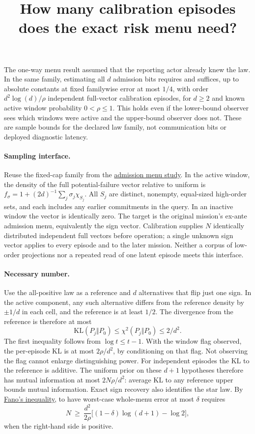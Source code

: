 \documentclass{article}
\title{How many calibration episodes does the exact risk menu need?}
\begin{document}
\maketitle

The one-way menu result assumed that the reporting actor already knew
the law. In the same family, estimating all \(d\) admission bits
requires and suffices, up to absolute constants at fixed familywise
error at most \(1/4\), with order \(d^2\log(d)/\rho\) independent
full-vector calibration episodes, for \(d\ge2\) and known active
window probability \(0<\rho\le1\). This holds even if the lower-bound
observer sees which windows were active and the upper-bound observer
does not. These are sample bounds for the declared law family,
not communication bits or deployed diagnostic latency.

\paragraph{Sampling interface.}
Reuse the fixed-cap family from the
\href{../Risk_Bits_Before_The_Query.tex}{admission menu study}.
In the active window, the density of the full potential-failure
vector relative to uniform is
\(f_\sigma=1+(2d)^{-1}\sum_j\sigma_j\chi_{S_j}\).
All \(S_j\) are distinct, nonempty, equal-sized high-order
sets, and each includes any earlier commitments in the query.
In an inactive window the vector is identically zero. The target
is the original mission's ex-ante admission menu, equivalently
the sign vector. Calibration supplies \(N\) identically
distributed independent full vectors before operation; a single
unknown sign vector applies to every episode and to the later
mission. Neither a corpus of low-order projections nor a
repeated read of one latent episode meets this interface.

\paragraph{Necessary number.}
Use the all-positive law as a reference and \(d\) alternatives
that flip just one sign. In the active component, any such
alternative differs from the reference density by
\(\pm 1/d\) in each cell, and the reference is at least \(1/2\).
The divergence from the reference is therefore at most
\[
 \mathrm{KL}(P_j\Vert P_0)
 \le \chi^2(P_j\Vert P_0)\le 2/d^2 .
\]
The first inequality follows from \(\log t\le t-1\).
With the window flag observed, the per-episode KL is at most
\(2\rho/d^2\), by conditioning on that flag. Not observing the
flag cannot enlarge distinguishing power. For independent episodes
the KL to the reference is additive. The uniform prior on these
\(d+1\) hypotheses therefore has mutual information at most
\(2N\rho/d^2\): average KL to any reference upper bounds mutual
information. Exact sign recovery also identifies the star law.
By \href{https://www.stat.yale.edu/~yw562/teaching/598/lec13.pdf}{Fano's inequality},
to have worst-case whole-menu error at most \(\delta\) requires
\[
 N\ \ge\ \frac{d^2}{2\rho}
           \big[(1-\delta)\log(d+1)-\log 2\big],
\]
when the right-hand side is positive.
\end{document}
